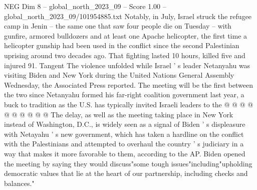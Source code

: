\begin{textsample}{NEG Dim 8 – global\_north\_2023\_09 – Score 1.00 – global\_north\_2023\_09/101954885.txt}
Notably, in July, Israel struck the refugee camp in Jenin -- the same one that saw four people die on Tuesday -- with gunfire, armored bulldozers and at least one Apache helicopter, the first time a helicopter gunship had been used in the conflict since the second Palestinian uprising around two decades ago.
That fighting lasted 10 hours, killed five and injured 91.
Tangent The violence unfolded while Israel ' s leader Netanyahu was visiting Biden and New York during the United Nations General Assembly Wednesday, the Associated Press reported.
The meeting will be the first between the two since Netanyahu formed his far-right coalition government last year, a buck to tradition as the U.S. has typically invited Israeli leaders to the @ @ @ @ @ @ @ @ @ @ The delay, as well as the meeting taking place in New York instead of Washington, D.C., is widely seen as a signal of Biden ' s displeasure with Netayahu ' s new government, which has taken a hardline on the conflict with the Palestinians and attempted to overhaul the country ' s judiciary in a way that makes it more favorable to them, according to the AP.
Biden opened the meeting by saying they would discuss"some tough issues"including"upholding democratic values that lie at the heart of our partnership, including checks and balances."

\end{textsample}
